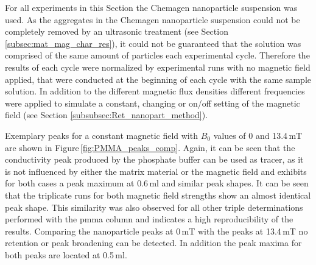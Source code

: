 For all experiments in this Section the Chemagen nanoparticle suspension was used. 
As the aggregates in the Chemagen nanoparticle suspension could not be completely removed by an ultrasonic treatment (see Section \ref{subsec:mat_mag_char_res}), it could not be guaranteed that the solution was comprised of the same amount of particles each experimental cycle. Therefore the results of each cycle were normalized by experimental runs with no magnetic field applied, that were conducted at the beginning of each cycle with the same sample solution. In addition to the different magnetic flux densities different frequencies were applied to simulate a constant, changing or on/off setting of the magnetic field (see Section \ref{subsubsec:Ret_nanopart_method}). 
  
Exemplary peaks for a constant magnetic field with $B_{0}$ values of 0 and 13.4\,mT are shown in Figure\,\ref{fig:PMMA_peaks_comp}. Again, it can be seen that the conductivity peak produced by the phosphate buffer can be used as tracer, as it is not influenced by either the matrix material or the magnetic field and exhibits for both cases a peak maximum at 0.6\,ml and similar peak shapes. It can be seen that the triplicate runs for both magnetic field strengths show an almost identical peak shape. This similarity was also observed for all other triple determinations performed with the \gls{pmma} column and indicates a high reproducibility of the results. Comparing the nanoparticle peaks at 0\,mT with the peaks at 13.4\,mT no retention or peak broadening can be detected. In addition the peak maxima for both peaks are located at 0.5\,ml. 

